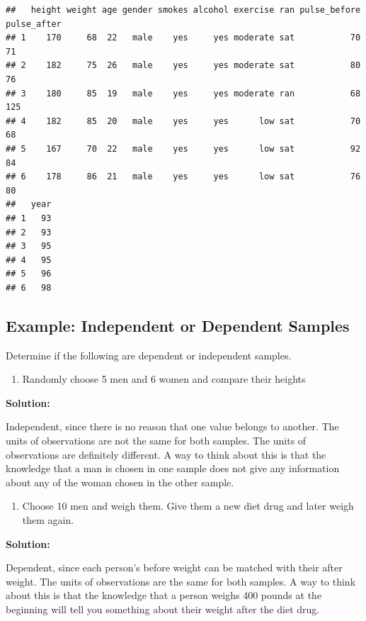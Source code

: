 \documentclass[
]{book}
\providecommand{\tightlist}{%
  \setlength{\itemsep}{0pt}\setlength{\parskip}{0pt}}
\begin{document}
\begin{verbatim}
##   height weight age gender smokes alcohol exercise ran pulse_before pulse_after
## 1    170     68  22   male    yes     yes moderate sat           70          71
## 2    182     75  26   male    yes     yes moderate sat           80          76
## 3    180     85  19   male    yes     yes moderate ran           68         125
## 4    182     85  20   male    yes     yes      low sat           70          68
## 5    167     70  22   male    yes     yes      low sat           92          84
## 6    178     86  21   male    yes     yes      low sat           76          80
##   year
## 1   93
## 2   93
## 3   95
## 4   95
## 5   96
## 6   98
\end{verbatim}

\hypertarget{example-independent-or-dependent-samples}{%
\subsection{Example: Independent or Dependent Samples}\label{example-independent-or-dependent-samples}}

Determine if the following are dependent or independent samples.

\begin{enumerate}
\def\labelenumi{\alph{enumi}.}
\tightlist
\item
  Randomly choose 5 men and 6 women and compare their heights
\end{enumerate}

\textbf{Solution:}

Independent, since there is no reason that one value belongs to another. The units of observations are not the same for both samples. The units of observations are definitely different. A way to think about this is that the knowledge that a man is chosen in one sample does not give any information about any of the woman chosen in the other sample.

\begin{enumerate}
\def\labelenumi{\alph{enumi}.}
\setcounter{enumi}{1}
\tightlist
\item
  Choose 10 men and weigh them. Give them a new diet drug and later weigh them again.
\end{enumerate}

\textbf{Solution:}

Dependent, since each person's before weight can be matched with their after weight. The units of observations are the same for both samples. A way to think about this is that the knowledge that a person weighs 400 pounds at the beginning will tell you something about their weight after the diet drug.
\end{document}
